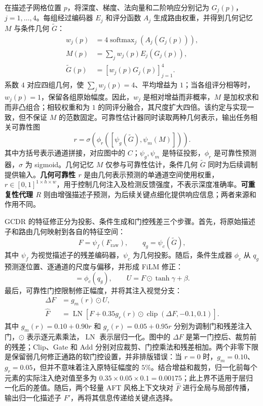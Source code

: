 \documentclass{article}
\begin{document}
在描述子网格位置 $p$，将深度、梯度、法向量和二阶响应分别记为 $G_j(p)$，$j=1,\ldots,4$。每组经过编码器 $E_j$ 和评分函数 $A_j$ 生成路由权重，并得到几何记忆 $M$ 与条件几何 $\widetilde G$：
\begin{equation}
\begin{aligned}
w_j(p)&=4\operatorname{softmax}_j(A_j(G_j(p))),\\
M(p)&=\sum_j w_j(p)E_j(G_j(p)),\\
\widetilde G(p)&=[w_j(p)G_j(p)]_{j=1}^{4}.
\end{aligned}
\label{eq:geometry-routing}
\end{equation}
系数 $4$ 对应四组几何，使 $\sum_jw_j(p)=4$、平均增益为 $1$；当各组评分相等时，$w_j(p)=1$，保留各组原始幅度。因此，$w_j$ 是相对增益而非概率，$M$ 是加权求和而非凸组合；相较权重和为 $1$ 的同评分融合，其尺度扩大四倍。该约定与实现一致，但不保证 $M$ 的范数固定。可靠性估计器同时读取两种几何表示，输出任务相关可靠性图
\begin{equation}
r=\sigma\left(\phi_r([\psi_g(\widetilde G),\psi_m(M)])\right).
\label{eq:geometry-reliability}
\end{equation}
其中方括号表示通道拼接，对应图中的 $C$；$\psi_g,\psi_m$ 是特征投影，$\phi_r$ 是可靠性预测器，$\sigma$ 为 sigmoid。几何记忆 $M$ 仅参与可靠性估计，条件几何 $\widetilde G$ 同时为后续调制提供输入。\textbf{几何可靠性 $r$} 是由几何表示预测的单通道空间使用权重，$r\in[0,1]^{1\times h\times w}$，用于控制几何注入及检测反馈强度，不表示深度准确率。\textbf{可重复性代理 $R$} 则由增强描述子预测，为后续关键点细化提供响应信息；两者来源和作用不同。

GCDR 的特征修正分为投影、条件生成和门控残差三个步骤。首先，将原始描述子和路由几何映射到各自的特征空间：
\begin{equation}
F=\psi_f(F_{\mathrm{raw}}),\qquad q_g=\psi_c(\widetilde G),
\label{eq:gcdr-projection}
\end{equation}
其中 $\psi_f$ 为视觉描述子的残差编码器，$\psi_c$ 为几何投影。随后，条件生成器 $\phi_c$ 从 $q_g$ 预测逐位置、逐通道的尺度与偏移，并形成 FiLM 修正：
\begin{equation}
[\gamma,\beta]=\phi_c(q_g),\qquad U=F\odot\tanh\gamma+\beta.
\label{eq:gcdr-conditioning}
\end{equation}
最后，可靠性门控限制修正幅度，并将其注入视觉分支：
\begin{equation}
\begin{aligned}
\Delta F&=g_m(r)\odot U,\\
\widehat F&=\operatorname{LN}\left[F+0.35g_r(r)\odot\operatorname{clip}(\Delta F,-0.1,0.1)\right].
\end{aligned}
\label{eq:gcdr-residual}
\end{equation}
其中 $g_m(r)=0.10+0.90r$ 和 $g_r(r)=0.05+0.95r$ 分别为调制门和残差注入门，$\odot$ 表示逐元素乘法，$\operatorname{LN}$ 表示层归一化。图中的 $\Delta F$ 是第一门控后、裁剪前的残差；Clip、Gate 和 Add 分别对应裁剪、门控乘法和残差相加。两个非零下限是保留弱几何修正通路的软门控设置，并非排版错误：当 $r=0$ 时，$g_m=0.10$、$g_r=0.05$，但并不意味着注入原特征幅度的 $5\%$。结合增益和裁剪，归一化前每个元素的实际注入绝对值至多为 $0.35\times0.05\times0.1=0.00175$；此上界不适用于层归一化后的差值。随后，两个轻量 AFT 风格上下文块对 $\widehat F$ 进行全局与局部传播，输出归一化描述子 $F'$，再将其信息传递给关键点选择。
\end{document}
